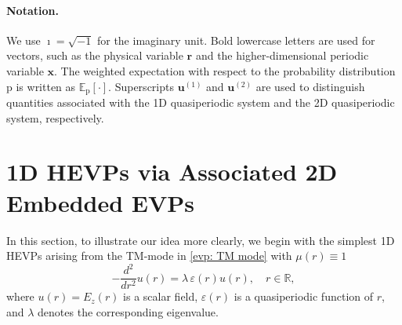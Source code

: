 \documentclass[11pt]{article}
\newcommand{\tr}{\textcolor{red}}
\def\r{\mathbf{r}}
\def\x{\mathbf{x}}
\numberwithin{equation}{section}
\begin{document}

\paragraph{Notation.}
We use $\imath=\sqrt{-1}$ for the imaginary unit. Bold lowercase letters are used for vectors, such as the physical variable $\r$ and the higher-dimensional periodic variable $\x$. The weighted expectation with respect to the probability distribution $\mathrm{p}$ is written as $\mathbb E_{\mathrm p}[\cdot]$. Superscripts $\boldsymbol{u}^{(1)}$ and $\boldsymbol{u}^{(2)}$ are used to distinguish quantities associated with the 1D quasiperiodic system and the 2D quasiperiodic system, respectively.

\section{1D HEVPs via Associated 2D Embedded EVPs} \label{section: 1Dto2D}

In this section, to illustrate our idea more clearly, we begin with the simplest 1D HEVPs arising from the TM-mode in \eqref{evp: TM mode} with $\mu(r) \equiv 1$
\begin{equation} \label{evp: 1D HEVPs}
- \frac{d^2}{dr^2} u(r) = \lambda \, \varepsilon(r) u(r),
\quad r \in \mathbb{R},
\end{equation}
where $u(r) = E_z(r)$ is a scalar field, $\varepsilon(r)$ is a quasiperiodic function of $r$, and $\lambda$ denotes the corresponding eigenvalue.
\end{document}
